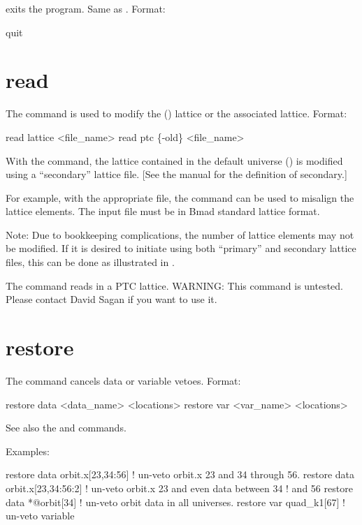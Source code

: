  exits the program. Same as .
Format:
\begin{example}
  quit
\end{example}

\section{read}
\label{s:read}

The  command is used to modify the (\bmad)  lattice
or the associated  lattice.
Format:
\begin{example}
  read lattice <file_name>
  read ptc \{-old\} <file_name>
\end{example}

\vskip 0.2in 

With the  command, the  lattice contained
in the default universe () is modified using a
``secondary'' lattice file. 
[See the \bmad manual for the definition of secondary.]

For example, with the appropriate file, the  command can be
used to misalign the lattice elements. The input file must be in Bmad
standard lattice format.

Note: Due to bookkeeping complications, the number of lattice elements
may not be modified. If it is desired to initiate \tao using both
``primary'' and secondary lattice files, this can be done as
illustrated in .

The  command reads in a PTC lattice. WARNING: This command
is untested. Please contact David Sagan if you want to use it.

\section{restore}
\label{s:restore}

The  command cancels data or variable
vetoes. Format:
\begin{example}
  restore data  <data_name> <locations>
  restore var <var_name> <locations>
\end{example}

\vskip 0.2in 
See also the 
and  commands.

Examples:
\begin{example}
  restore data orbit.x[23,34:56]   ! un-veto orbit.x 23 and 34 through 56.
  restore data orbit.x[23,34:56:2] ! un-veto orbit.x 23 and even data between 34 
                                   !                                          and 56
  restore data *@orbit[34]         ! un-veto orbit data in all universes.
  restore var quad_k1[67]          ! un-veto variable
\end{example}

